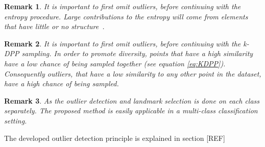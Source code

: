 \documentclass[preprint,12pt]{elsarticle}
\newtheorem*{remark}{Remark}
\begin{document}
	\begin{remark}
		It is important to first omit outliers, before continuing with the entropy procedure. Large contributions to the entropy will come from elements that have little or no structure~\cite{girolami2002orthogonal}.
	\end{remark}

	
	\begin{remark}
		It is important to first omit outliers, before continuing with the k-DPP sampling. In order to promote diversity, points that have a high similarity have a low chance of being sampled together (see equation \eqref{eq:KDPP}). Consequently outliers, that have a low similarity to any other point in the dataset, have a high chance of being sampled.
	\end{remark}
	 
 	\begin{remark}
	 	As the outlier detection and landmark selection is done on each class separately. The proposed method is easily applicable in a multi-class classification setting. 
	 \end{remark}
	 
	 The developed outlier detection principle is explained in section [REF]
	
\end{document}
